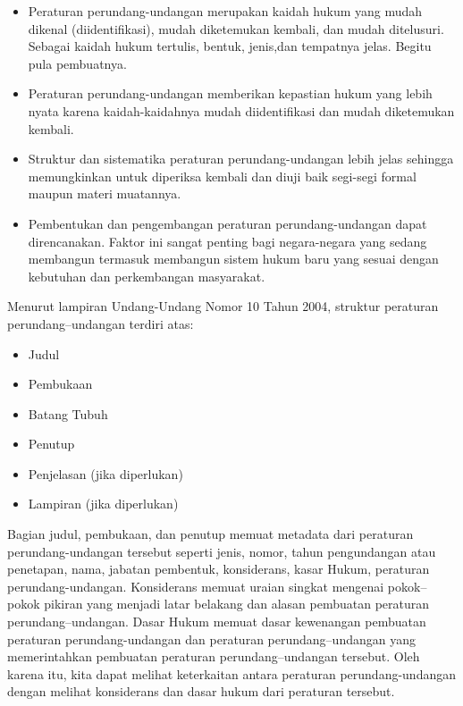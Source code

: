 \begin{itemize}
  \itemsep1pt\parskip0pt
  \item Peraturan perundang-undangan merupakan kaidah hukum yang mudah dikenal (diidentifikasi),
        mudah diketemukan kembali, dan mudah ditelusuri. Sebagai kaidah hukum tertulis, bentuk, jenis,dan
        tempatnya jelas. Begitu pula pembuatnya.
  \item Peraturan perundang-undangan memberikan kepastian hukum yang lebih nyata karena
        kaidah-kaidahnya mudah diidentifikasi dan mudah diketemukan kembali.
  \item Struktur dan sistematika peraturan perundang-undangan lebih jelas sehingga memungkinkan
        untuk diperiksa kembali dan diuji baik segi-segi formal maupun materi muatannya.
  \item Pembentukan dan pengembangan peraturan perundang-undangan dapat direncanakan. Faktor ini
        sangat penting bagi negara-negara yang sedang membangun termasuk membangun sistem hukum baru yang
        sesuai dengan kebutuhan dan perkembangan masyarakat.
\end{itemize}

Menurut lampiran Undang-Undang Nomor 10 Tahun 2004, struktur peraturan perundang--undangan terdiri
atas:

\begin{itemize}
  \itemsep1pt\parskip0pt
  \item Judul
  \item Pembukaan
  \item Batang Tubuh
  \item Penutup
  \item Penjelasan (jika diperlukan)
  \item Lampiran (jika diperlukan)
\end{itemize}

Bagian judul, pembukaan, dan penutup memuat metadata dari peraturan perundang-undangan tersebut
seperti jenis, nomor, tahun pengundangan atau penetapan, nama, jabatan pembentuk, konsiderans, kasar
Hukum, peraturan perundang-undangan. Konsiderans memuat uraian singkat mengenai pokok--pokok pikiran
yang menjadi latar belakang dan alasan pembuatan peraturan perundang--undangan. Dasar Hukum memuat
dasar kewenangan pembuatan peraturan perundang-undangan dan peraturan perundang--undangan yang
memerintahkan pembuatan peraturan perundang--undangan tersebut. Oleh karena itu, kita dapat melihat
keterkaitan antara peraturan perundang-undangan dengan melihat konsiderans dan dasar hukum dari
peraturan tersebut.

